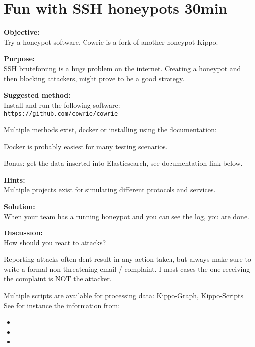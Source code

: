 \documentclass[a4paper,11pt,notitlepage]{report}
\begin{document}
\chapter{Fun with SSH honeypots 30min}
\label{ex:ssh-honeypot}

{\bf Objective:}\\
Try a honeypot software. Cowrie is a fork of another honeypot Kippo.

{\bf Purpose:}\\
SSH bruteforcing is a huge problem on the internet. Creating a honeypot and then blocking attackers, might prove to be a good strategy.

{\bf Suggested method:}\\
Install and run the following software:\\
\verb+https://github.com/cowrie/cowrie+

Multiple methods exist, docker or installing using the documentation:\\

Docker is probably easiest for many testing scenarios.

Bonus: get the data inserted into Elasticsearch, see documentation link below.

{\bf Hints:}\\
Multiple projects exist for simulating different protocols and services.

{\bf Solution:}\\
When your team has a running honeypot and you can see the log, you are done.

{\bf Discussion:}\\
How should you react to attacks?

Reporting attacks often dont result in any action taken, but always make sure to write a formal non-threatening email / complaint. I most cases the one receiving the complaint is NOT the attacker.

Multiple scripts are available for processing data: Kippo-Graph, Kippo-Scripts
See for instance the information from:
\begin{itemize}
\item {}
\item {}
\item {}
\end{itemize}
\end{document}
